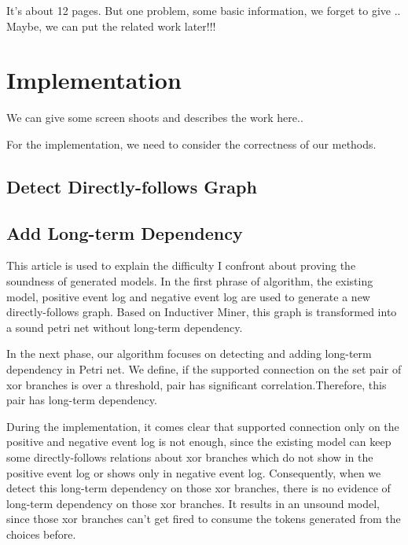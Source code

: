 \documentclass[]{article}
\begin{document}
It's about 12 pages. But one problem, some basic information, we forget to give .. Maybe, we can put the related work later!!!


\section{Implementation}
We can give some screen shoots and describes the work here..

For the implementation, we need to consider the correctness of our methods.
\subsection{Detect Directly-follows Graph}


\subsection{Add Long-term Dependency}
This article is used to explain the difficulty I confront about proving the soundness of generated models.
In the first phrase of algorithm, the existing model, positive event log and negative event log are used to generate a new directly-follows graph. Based on Inductiver Miner, this graph is transformed into a sound petri net without long-term dependency. 

In the next phase, our algorithm focuses on detecting and adding long-term dependency in Petri net. We define, if the supported connection on the set pair of xor branches is over a threshold, pair has significant correlation.Therefore, this pair has long-term dependency.

During the implementation, it comes clear that supported connection only on the positive and negative event log is not enough, since the existing model can keep some directly-follows relations about xor branches which do not show in the positive event log or shows only in negative event log. Consequently, when we detect this long-term dependency on those xor branches, there is no evidence of long-term dependency on those xor branches. It results in an unsound model, since those xor branches can't get fired to consume the tokens generated from the choices before.

\end{document}
